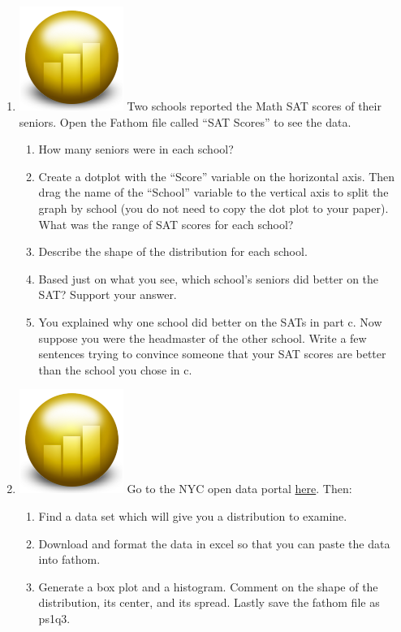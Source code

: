 \documentclass[12pt]{article}
\theoremstyle{plain}     %
\begin{document}
\begin{enumerate}
	\item \includegraphics[scale=.1]{fathom.png} Two schools reported the Math SAT scores of their seniors.  Open the Fathom file called “SAT Scores” to see the data.
	\begin{enumerate}
		\item How many seniors were in each school?
		\item Create a dotplot with the “Score” variable on the horizontal axis.  Then drag the name of the “School” variable to the vertical axis to split the graph by school (you do not need to copy the dot plot to your paper).  What was the range of SAT scores for each school?
		\item Describe the shape of the distribution for each school.
		\item Based just on what you see, which school’s seniors did better on the SAT?  Support your answer.
		\item You explained why one school did better on the SATs in part c.  Now suppose you were the headmaster of the other school.  Write a few sentences trying to convince someone that your SAT scores are better than the school you chose in c.
\end{enumerate}	 

	\item \includegraphics[scale=.1]{fathom.png} Go to the NYC open data portal \href{https://data.cityofnewyork.us/}{here}. Then:
		\begin{enumerate}
			\item Find a data set which will give you a distribution to examine.\\
			\item Download and format the data in excel so that you can paste the data into fathom.
			\item Generate a box plot and a histogram. Comment on the shape of the distribution, its center, and its spread. Lastly save the fathom file as ps1q3.
		\end{enumerate}
		 

\end{enumerate}
\end{document}
